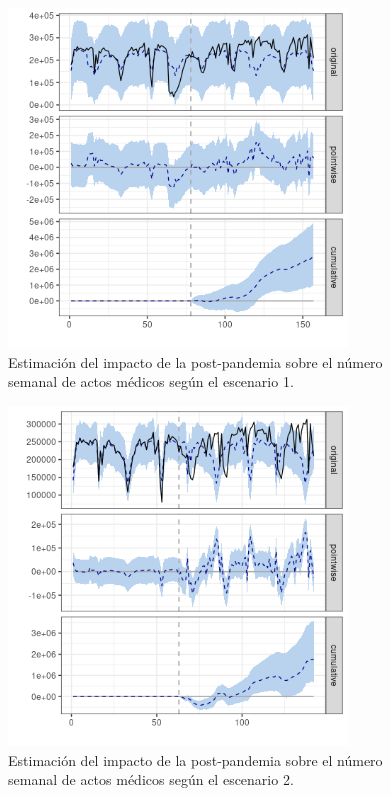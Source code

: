 \documentclass[12pt,twoside]{article} %
\begin{document}
  \begin{center}
  \begin{figure}[H]
    \includegraphics[width=9cm]{global_post_scen1.png}\caption{Estimación del impacto de la post-pandemia sobre el número semanal de actos médicos según el escenario 1.}\label{global_postcovid1}
  \end{figure}
  \end{center}
  
  \begin{center}
      \begin{figure}[H]
        \includegraphics[width=9cm]{global_post_scen2.png}\caption{Estimación del impacto de la post-pandemia sobre el número semanal de actos médicos según el escenario 2.}\label{global_postcovid2}
      \end{figure}
      \end{center}
\end{document}
